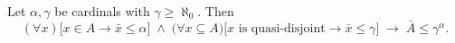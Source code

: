 Let $\alpha, \gamma$ be cardinals with $\gamma \geq \aleph_0$. Then
$$(\forall x)\bigl[x \in A \rightarrow \bar{x} \leq \alpha\bigr] \;\wedge\; \bigl(\forall x \subseteq A\bigr)\bigl[x \text{ is quasi-disjoint} \rightarrow \bar{x} \leq \gamma\bigr] \;\rightarrow\; \bar{A} \leq \gamma^\alpha.$$
